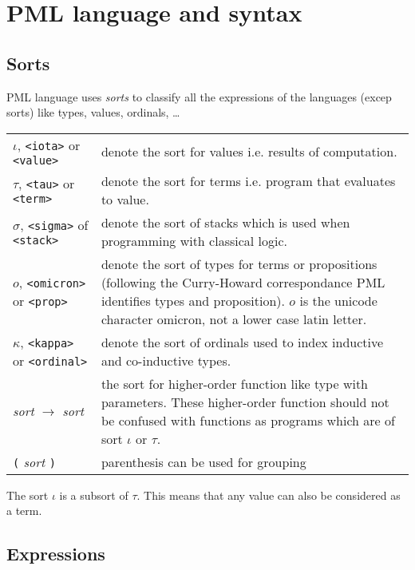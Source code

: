 \chapter{PML language and syntax}

\section{Sorts}

PML language uses \emph{sorts} to classify all the expressions of the
languages (excep sorts) like types, values, ordinals, \dots

\begin{tabular}{ll}
  $\iota$, \verb!<iota>! or \verb!<value>!
  & denote the sort for values i.e. results of computation. \\

  $\tau$, \verb!<tau>! or \verb!<term>!
  & denote the sort for terms i.e. program that evaluates to value. \\

  $\sigma$, \verb!<sigma>! of \verb!<stack>!
  & denote the sort of stacks which is used when programming with classical
  logic.\\

  $o$, \verb!<omicron>! or \verb!<prop>!
  & denote the sort of types for terms or propositions (following the
  Curry-Howard correspondance PML identifies types and proposition).
  $o$ is the unicode character omicron, not a lower case latin letter. \\

  $\kappa$, \verb!<kappa>! or \verb!<ordinal>!
  & denote the sort of ordinals used to index inductive and co-inductive
  types. \\

  \emph{sort} $\rightarrow$ \emph{sort}
  & the sort for higher-order function like type with parameters. These
  higher-order function should not be confused with functions as programs
  which are of sort $\iota$ or $\tau$. \\

  \verb!(! \emph{sort} \verb!)!
  & parenthesis can be used for grouping \\
\end{tabular}

The sort $\iota$ is a subsort of $\tau$. This means that any value can also
be considered as a term.

\section{Expressions}

